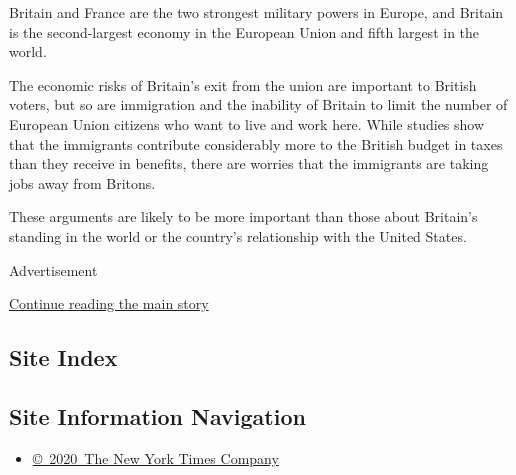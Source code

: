 Britain and France are the two strongest military powers in Europe, and
Britain is the second-largest economy in the European Union and fifth
largest in the world.

The economic risks of Britain's exit from the union are important to
British voters, but so are immigration and the inability of Britain to
limit the number of European Union citizens who want to live and work
here. While studies show that the immigrants contribute considerably
more to the British budget in taxes than they receive in benefits, there
are worries that the immigrants are taking jobs away from Britons.

These arguments are likely to be more important than those about
Britain's standing in the world or the country's relationship with the
United States.

Advertisement

\protect\hyperlink{after-bottom}{Continue reading the main story}

\hypertarget{site-index}{%
\subsection{Site Index}\label{site-index}}

\hypertarget{site-information-navigation}{%
\subsection{Site Information
Navigation}\label{site-information-navigation}}

\begin{itemize}
\tightlist
\item
  \href{https://help.nytimes.com/hc/en-us/articles/115014792127-Copyright-notice}{©~2020~The
  New York Times Company}
\end{itemize}

